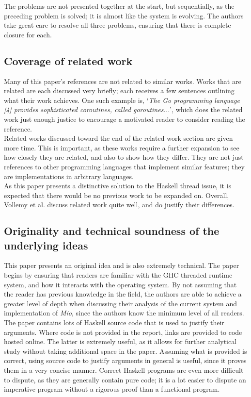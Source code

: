 \documentclass[9pt]{report}
\begin{document}
The problems are not presented together at the start, but sequentially, as the preceding problem is solved; it is almost like the system is evolving.
The authors take great care to resolve all three problems, ensuring that there is complete closure for each.\\

\subsection*{Coverage of related work}
Many of this paper's references are not related to similar works.
Works that are related are each discussed very briefly; each receives a few sentences outlining what their work achieves.
One such example is, `{\it The Go programming language [4] provides sophisticated coroutines, called goroutines...}', which does the related work just enough justice to encourage a motivated reader to consider reading the reference.\\

\noindent
Related works discussed toward the end of the related work section are given more time.
This is important, as these works require a further expansion to see how closely they are related, and also to show how they differ.
They are not just references to other programming languages that implement similar features; they are implementations in arbitrary languages.\\

\noindent
As this paper presents a distinctive solution to the Haskell thread issue, it is expected that there would be no previous work to be expanded on.
Overall, Vollemy et al. discuss related work quite well, and do justify their differences.

\subsection*{Originality and technical soundness of the underlying ideas}
This paper presents an original idea and is also extremely technical.
The paper begins by ensuring that readers are familiar with the GHC threaded runtime system, and how it interacts with the operating system.
By not assuming that the reader has previous knowledge in the field, the authors are able to achieve a greater level of depth when discussing their analysis of the current system and implementation of {\it Mio}, since the authors know the minimum level of all readers.\\

\noindent
The paper contains lots of Haskell source code that is used to justify their arguments.
Where code is not provided in the report, links are provided to code hosted online.
The latter is extremely useful, as it allows for further analytical study without taking additional space in the paper.
Assuming what is provided is correct, using source code to justify arguments in general is useful, since it proves them in a very concise manner.
Correct Haskell programs are even more difficult to dispute, as they are generally contain pure code; it is a lot easier to dispute an imperative program without a rigorous proof than a functional program.\\
\end{document}
